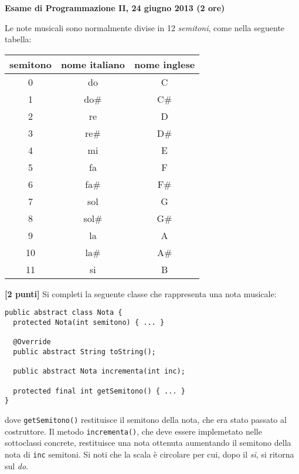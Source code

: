 \documentclass{article}[10pt]
\newcounter{esnu}
\newenvironment{esercizio}{\medskip \noindent {\bf Esercizio\addtocounter{esnu}{1} \arabic{esnu}}}{}
\begin{document}
\begin{center} {\bf Esame di Programmazione II, 24 giugno 2013 (2 ore)}\end{center}

Le note musicali sono normalmente divise in 12 \emph{semitoni}, come nella seguente tabella:

\begin{center}
\begin{tabular}{c|c|c}
  semitono & nome italiano & nome inglese \\\hline
  0 & do & C \\
  1 & do\# & C\#\\
  2 & re & D\\
  3 & re\# & D\#\\
  4 & mi & E \\
  5 & fa & F \\
  6 & fa\# & F\# \\
  7 & sol & G \\
  8 & sol\# & G\# \\
  9 & la & A \\
  10 & la\# & A\# \\
  11 & si & B
\end{tabular}
\end{center}

\begin{esercizio}
\textbf{[2 punti]}
Si completi la seguente classe che rappresenta una nota musicale:
%
{\small
\begin{verbatim}
public abstract class Nota {
  protected Nota(int semitono) { ... }

  @Override
  public abstract String toString();

  public abstract Nota incrementa(int inc);

  protected final int getSemitono() { ... }
}
\end{verbatim}
}

\noindent
dove \texttt{getSemitono()} restituisce il semitono della nota, che era stato passato al costruttore.
Il metodo \texttt{incrementa()}, che deve essere implemetato nelle sottoclassi concrete,
restituisce una nota ottenuta aumentando il semitono della nota di \texttt{inc} semitoni. Si noti
che la scala \`e circolare per cui, dopo il \emph{si}, si ritorna sul \emph{do}.
\end{esercizio}
\end{document}
